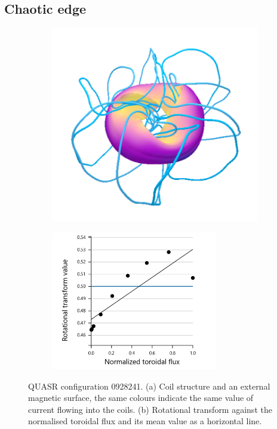 \subsection{Chaotic edge}\label{sec:quars-0928241}

\begin{figure}[H]
    \centering
    \begin{subfigure}[t]{0.49\textwidth}
        \centering
        \includegraphics[width=\textwidth]{images/quasrs/config-0928241.png}
        \caption{}
        \label{fig:coils-0928241}
    \end{subfigure}
    \hfill
    \begin{subfigure}[t]{0.49\textwidth}
        \centering
        \includegraphics[width=0.8\textwidth]{images/quasrs/iota-0928241.png}
        \caption{}
        \label{fig:iota-0928241}
    \end{subfigure}
    \caption{QUASR configuration 0928241. (a) Coil structure and an external magnetic surface, the same colours indicate the same value of current flowing into the coils. (b) Rotational transform against the normalised toroidal flux and its mean value as a horizontal line.}
    \label{fig:config-0928241}
\end{figure}

